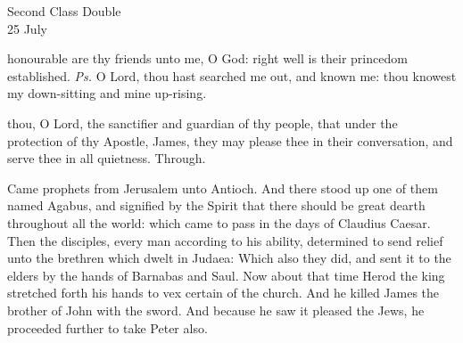 \begin{inhead}
    {Second Class Double\\
25 July}
\end{inhead}

\introit
{} honourable are thy friends unto me, O God: right well is their princedom established. \textit{Ps.} O Lord, thou hast searched me out, and known me: thou knowest my down-sitting and mine up-rising.

\collect
 thou, O Lord, the sanctifier and guardian of thy people, that under the protection of thy Apostle, James, they may please thee in their conversation, and serve thee in all quietness. Through.

 Came prophets from Jerusalem unto Antioch. And there stood up one of them named Agabus, and signified by the Spirit that there should be great dearth throughout all the world: which came to pass in the days of Claudius Caesar. Then the disciples, every man according to his ability, determined to send relief unto the brethren which dwelt in Judaea: Which also they did, and sent it to the elders by the hands of Barnabas and Saul. Now about that time Herod the king stretched forth his hands to vex certain of the church. And he killed James the brother of John with the sword. And because he saw it pleased the Jews, he proceeded further to take Peter also.



